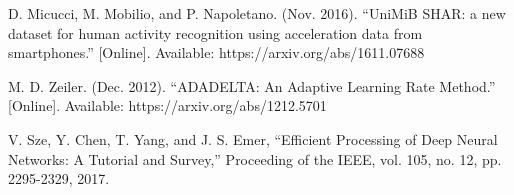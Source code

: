 \documentclass[twoside,twocolumn]{article}
\begin{document}
\begin{thebibliography}{00}
 D. Micucci, M. Mobilio, and P. Napoletano. (Nov. 2016). ``UniMiB SHAR: a new dataset for human activity recognition using acceleration data from smartphones.'' [Online]. Available: https://arxiv.org/abs/1611.07688

 M. D. Zeiler. (Dec. 2012). ``ADADELTA: An Adaptive Learning Rate Method.'' [Online]. Available: https://arxiv.org/abs/1212.5701

 V. Sze, Y. Chen, T. Yang, and J. S. Emer, ``Efficient Processing of Deep Neural Networks: {A} Tutorial and Survey,'' Proceeding of the IEEE, vol. 105, no. 12, pp. 2295-2329, 2017.

\end{thebibliography}

\end{document}
